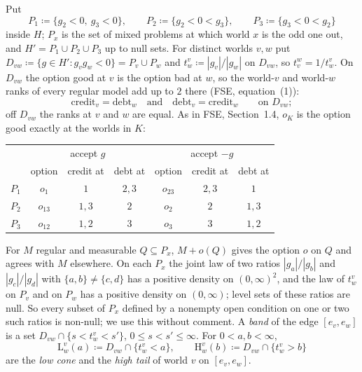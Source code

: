 \documentclass[11pt]{article}
\theoremstyle{definition}\newtheorem{definition}[theorem]{Definition}
\theoremstyle{remark}\newtheorem{remark}[theorem]{Remark}
\newcommand{\debt}{\mathrm{debt}}
\newcommand{\cred}{\mathrm{credit}}
\newcommand{\Lo}[3]{\mathrm L^{#1}_{#2}(#3)}
\newcommand{\Hi}[3]{\mathrm H^{#1}_{#2}(#3)}
\begin{document}
Put
\[
 P_1\coloneqq\{g_2<0,\ g_3<0\},\qquad P_2\coloneqq\{g_2<0<g_3\},\qquad
 P_3\coloneqq\{g_3<0<g_2\}
\]
inside $H$; $P_x$ is the set of mixed problems at which world $x$ is the odd
one out, and $H'=P_1\cup P_2\cup P_3$ up to null sets. For distinct worlds
$v,w$ put $D_{vw}\coloneqq\{g\in H':g_vg_w<0\}=P_v\cup P_w$ and
$t^v_w\coloneqq|g_v|/|g_w|$ on $D_{vw}$, so $t^w_v=1/t^v_w$. On $D_{vw}$
the option good at $v$ is the option bad at $w$, so the world-$v$ and
world-$w$ ranks of every regular model add up to $2$ there (FSE,
equation~(1)):
\begin{equation}
 \cred_v=\debt_w\quad\text{and}\quad\debt_v=\cred_w\qquad\text{on }D_{vw};
 \label{eq:swap}
\end{equation}
off $D_{vw}$ the ranks at $v$ and $w$ are equal. As in FSE, Section~1.4,
$o_K$ is the option good exactly at the worlds in $K$:
\begin{center}
\begin{tabular}{c|ccc|ccc}
 & \multicolumn{3}{c|}{accept $g$} & \multicolumn{3}{c}{accept $-g$}\\
 & option & credit at & debt at & option & credit at & debt at\\\hline
$P_1$ & $o_1$ & $1$ & $2,3$ & $o_{23}$ & $2,3$ & $1$\\
$P_2$ & $o_{13}$ & $1,3$ & $2$ & $o_2$ & $2$ & $1,3$\\
$P_3$ & $o_{12}$ & $1,2$ & $3$ & $o_3$ & $3$ & $1,2$
\end{tabular}
\end{center}
For $M$ regular and measurable $Q\subseteq P_x$, $M+o(Q)$ gives the option
$o$ on $Q$ and agrees with $M$ elsewhere. On each $P_x$ the joint law of two
ratios $|g_a|/|g_b|$ and $|g_c|/|g_d|$ with $\{a,b\}\ne\{c,d\}$ has a
positive density on $(0,\infty)^2$, and the law of $t^v_w$ on $P_v$ and on
$P_w$ has a positive density on $(0,\infty)$; level sets of these ratios
are null. So every subset of $P_x$ defined by a nonempty open condition on
one or two such ratios is non-null; we use this without comment. A
\emph{band} of the edge $[e_v,e_w]$ is a set $D_{vw}\cap\{s<t^v_w<s'\}$,
$0\le s<s'\le\infty$. For $0<a,b<\infty$,
\[
 \Lo vwa\coloneqq D_{vw}\cap\{t^v_w<a\},\qquad
 \Hi vwb\coloneqq D_{vw}\cap\{t^v_w>b\}
\]
are the \emph{low cone} and the \emph{high tail} of world $v$ on
$[e_v,e_w]$.
\end{document}
